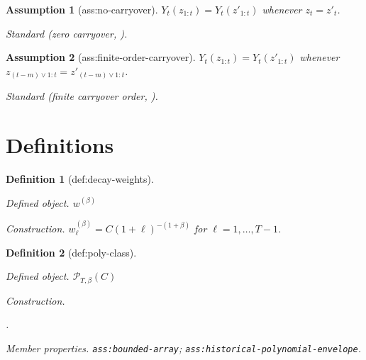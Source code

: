 \documentclass{article}
\newtheorem{assumption}{Assumption}
\newtheorem{definition}{Definition}
\begin{document}
\begin{assumption}[ass:no-carryover]\label{ass:no-carryover}
\(Y_t(z_{1:t})=Y_t(z'_{1:t})\) whenever \(z_t=z'_t\).
\par\smallskip\noindent\emph{Standard} (zero carryover, \cite{BojinovSimchiLeviZhao2023}).
\end{assumption}

\begin{assumption}[ass:finite-order-carryover]\label{ass:finite-order-carryover}
\(Y_t(z_{1:t})=Y_t(z'_{1:t})\) whenever \(z_{(t-m)\vee1:t}=z'_{(t-m)\vee1:t}\).
\par\smallskip\noindent\emph{Standard} (finite carryover order, \cite{BojinovSimchiLeviZhao2023}).
\end{assumption}

\section{Definitions}

\begin{definition}[def:decay-weights]\label{def:decay-weights}
\par\smallskip\noindent\emph{Defined object.} \(w^{(\beta)}\)
\par\smallskip\noindent\emph{Construction.} \(w^{(\beta)}_\ell=C(1+\ell)^{-(1+\beta)}\) for \(\ell=1,\ldots,T-1\).
\end{definition}

\begin{definition}[def:poly-class]\label{def:poly-class}
\par\smallskip\noindent\emph{Defined object.} \(\mathcal P_{T,\beta}(C)\)
\par\smallskip\noindent\emph{Construction.} \leavevmode\par\noindent {}\par\noindent.
\par\smallskip\noindent\emph{Member properties.} \texttt{ass:\allowbreak{}bounded-\allowbreak{}array}; \texttt{ass:\allowbreak{}historical-\allowbreak{}polynomial-\allowbreak{}envelope}.
\end{definition}
\end{document}

